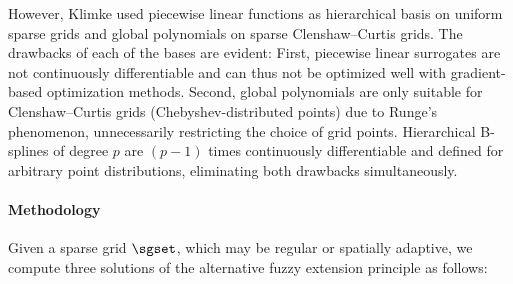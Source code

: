 However, Klimke used piecewise linear functions as hierarchical basis on
uniform sparse grids and global polynomials on sparse Clenshaw--Curtis grids.
The drawbacks of each of the bases are evident:
First, piecewise linear surrogates are not continuously differentiable and
can thus not be optimized well with gradient-based optimization methods.
Second, global polynomials are only suitable for
Clenshaw--Curtis grids (Chebyshev-distributed points)
due to Runge's phenomenon,
unnecessarily restricting the choice of grid points.
Hierarchical B-splines of degree $p$ are $(p - 1)$ times
continuously differentiable and defined for arbitrary point
distributions, eliminating both drawbacks simultaneously.

\paragraph{Methodology}

Given a sparse grid $\sgset$, which may be regular or spatially adaptive,
we compute three solutions of the alternative fuzzy extension principle
as follows:


